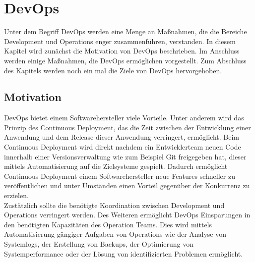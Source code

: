 \chapter{DevOps}
Unter dem Begriff DevOps werden eine Menge an Maßnahmen, die die Bereiche Development und Operations enger zusammenführen, verstanden. In diesem Kapitel wird zunächst die Motivation von DevOps beschrieben. Im Anschluss werden einige Maßnahmen, die DevOps ermöglichen vorgestellt. Zum Abschluss des Kapitels werden noch ein mal die Ziele von DevOps hervorgehoben.

\section{Motivation}
DevOps bietet einem Softwarehersteller viele Vorteile. Unter anderem wird das  Prinzip des Continuous Deployment, das die Zeit zwischen der Entwicklung einer Anwendung und dem Release dieser Anwendung verringert, ermöglicht. Beim Continuous Deployment wird direkt nachdem ein Entwicklerteam neuen Code innerhalb einer Versionsverwaltung wie zum Beispiel Git freigegeben hat, dieser mittels Automatisierung auf die Zielsysteme gespielt. Dadurch ermöglicht Continuous Deployment einem Softwarehersteller neue Features schneller zu veröffentlichen und unter Umständen einen Vorteil gegenüber der Konkurrenz zu erzielen.\\
Zustätzlich sollte die benötigte Koordination zwischen Development und Operations verringert werden. Des Weiteren ermöglicht DevOps Einsparungen in den benötigten Kapazitäten des Operation Teams. Dies wird mittels Automatisierung gängiger Aufgaben von Operations wie der Analyse von Systemlogs, der Erstellung von Backups, der Optimierung von Systemperformance oder der Lösung von identifizierten Problemen ermöglicht.

